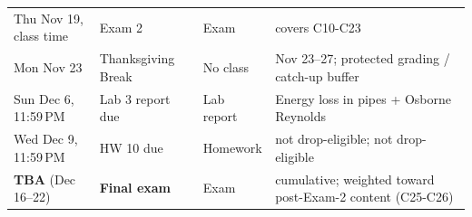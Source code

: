 \begin{longtable}{@{}L{0.190\textwidth} L{0.270\textwidth} L{0.110\textwidth} L{0.360\textwidth}@{}}
 Thu Nov 19, class time & Exam 2 & Exam & {\footnotesize covers C10-C23} \\
 Mon Nov 23 & Thanksgiving Break & No class & {\footnotesize Nov 23--27; protected grading / catch-up buffer} \\
 Sun Dec 6, 11:59\,PM & Lab 3 report due & Lab report & {\footnotesize Energy loss in pipes + Osborne Reynolds} \\
 Wed Dec 9, 11:59\,PM & HW 10 due & Homework & {\footnotesize not drop-eligible; not drop-eligible} \\
 \textbf{TBA} (Dec 16--22) & \textbf{Final exam} & Exam & {\footnotesize cumulative; weighted toward post-Exam-2 content (C25-C26)} \\
\end{longtable}
